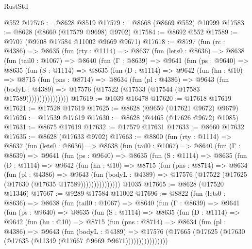 \begin{lexlean}{RustStd}
\begin{coremodule}
    @552
@17576 := @8628 @8519
@17579 := @8668 (@8669 @552) @10999
@17583 := @8628 (@8660 (@17579 @9698) @9702)
@17584 := @8692 @552
@17589 := @9707 (@9708 @17584 @11002 @9669 @9671)
@17618 := @8797
    (fun (rc : @4386) =>
    @8635
      (fun (rty : @1114) =>
      @8637
        (fun (lets0 : @8636) =>
        @8638
          (fun (tail0 : @1067) =>
          @8640
            (fun (Γ : @8639) =>
            @9641
              (fun (ps : @9640) =>
              @8635
                (fun (S : @1114) =>
                @8635
                  (fun (D : @1114) =>
                  @9642
                    (fun (hn : @10) =>
                    @8715
                      (fun (pns : @8714) =>
                      @8634
                        (fun (pl : @4386) =>
                        @9643
                          (fun (bodyL : @4389) =>
                          @17576 (@17522 (@17533 (@17544 (@17583 @17589))))))))))))))))
@17619 := @1039 @16478
@17620 := @17618 @17619
@17621 := @17528 @17619
@17625 := @8628 (@9659 (@17621 @9672) @9679)
@17626 := @17539 @17619
@17630 := @8628 (@4465 (@17626 @9672) @1085)
@17631 := @8675 @17619
@17632 := @17579 @17631
@17633 := @8660 @17632
@17635 := @8628 (@17633 @9702)
@17663 := @8800
    (fun (rty : @1114) =>
    @8637
      (fun (lets0 : @8636) =>
      @8638
        (fun (tail0 : @1067) =>
        @8640
          (fun (Γ : @8639) =>
          @9641
            (fun (ps : @9640) =>
            @8635
              (fun (S : @1114) =>
              @8635
                (fun (D : @1114) =>
                @9642
                  (fun (hn : @10) =>
                  @8715
                    (fun (pns : @8714) =>
                    @8634
                      (fun (pl : @4386) =>
                      @9643
                        (fun (bodyL : @4389) =>
                        @17576 (@17522 (@17625 (@17630 (@17635 @17589)))))))))))))))
    @1035
@17665 := @8628 (@17520 @11346)
@17667 := @9289 @17584 @11002
@17696 := @8822
    (fun (lets0 : @8636) =>
    @8638
      (fun (tail0 : @1067) =>
      @8640
        (fun (Γ : @8639) =>
        @9641
          (fun (ps : @9640) =>
          @8635
            (fun (S : @1114) =>
            @8635
              (fun (D : @1114) =>
              @9642
                (fun (hn : @10) =>
                @8715
                  (fun (pns : @8714) =>
                  @8634
                    (fun (pl : @4386) =>
                    @9643
                      (fun (bodyL : @4389) =>
                      @17576
                        (@17665 (@17625 (@17630 (@17635 (@11349 (@17667 @9669 @9671))))))))))))))))

\end{coremodule}
\end{lexlean}
